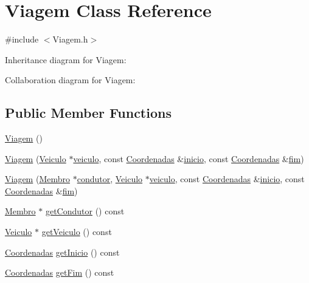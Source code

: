 \hypertarget{class_viagem}{\section{Viagem Class Reference}
\label{class_viagem}
}


{\ttfamily \#include $<$Viagem.\+h$>$}



Inheritance diagram for Viagem\+:


Collaboration diagram for Viagem\+:
\subsection*{Public Member Functions}
\begin{DoxyCompactItemize}
\item 
\hyperlink{class_viagem_a5b74d4780b008414c2045f5788b6afa5}{Viagem} ()
\item 
\hyperlink{class_viagem_a5ba9d09f2be9e317a906865c7c7cff7c}{Viagem} (\hyperlink{class_veiculo}{Veiculo} $\ast$\hyperlink{class_viagem_aee9386a44de6b6afb11faff59331f7b5}{veiculo}, const \hyperlink{class_coordenadas}{Coordenadas} \&\hyperlink{class_viagem_a0a871b6782ab9b478a530f2c15dc1e32}{inicio}, const \hyperlink{class_coordenadas}{Coordenadas} \&\hyperlink{class_viagem_ab54e61d41be0157f9e75b14c8e06137f}{fim})
\item 
\hyperlink{class_viagem_a78e5ed89a44c413db824eeed29632477}{Viagem} (\hyperlink{class_membro}{Membro} $\ast$\hyperlink{class_viagem_a015bb952a7afce6a348d0a9f88bdaf5c}{condutor}, \hyperlink{class_veiculo}{Veiculo} $\ast$\hyperlink{class_viagem_aee9386a44de6b6afb11faff59331f7b5}{veiculo}, const \hyperlink{class_coordenadas}{Coordenadas} \&\hyperlink{class_viagem_a0a871b6782ab9b478a530f2c15dc1e32}{inicio}, const \hyperlink{class_coordenadas}{Coordenadas} \&\hyperlink{class_viagem_ab54e61d41be0157f9e75b14c8e06137f}{fim})
\item 
\hyperlink{class_membro}{Membro} $\ast$ \hyperlink{class_viagem_a620b4026617bd2bb14587dc405a71a1d}{get\+Condutor} () const 
\item 
\hyperlink{class_veiculo}{Veiculo} $\ast$ \hyperlink{class_viagem_a382eb7613b4d67d0038f70aee311e514}{get\+Veiculo} () const 
\item 
\hyperlink{class_coordenadas}{Coordenadas} \hyperlink{class_viagem_a9fc0473efd849f4d221cb94789f90c53}{get\+Inicio} () const 
\item 
\hyperlink{class_coordenadas}{Coordenadas} \hyperlink{class_viagem_a8880fb61234fcbf1324201cb634932a5}{get\+Fim} () const 

\end{DoxyCompactItemize}
